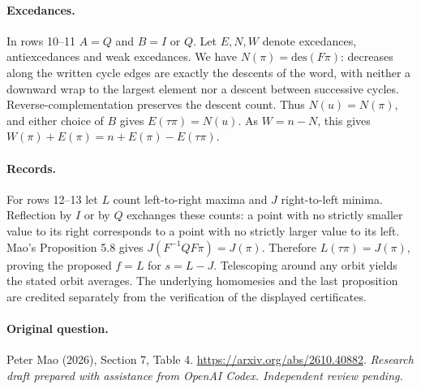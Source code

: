 \documentclass[11pt]{article}
\begin{document}
\paragraph{Excedances.} In rows 10--11 $A=Q$ and $B=I$ or $Q$. Let $E,N,W$ denote excedances, antiexcedances and weak excedances. We have $N(\pi)=\mathrm{des}(F\pi)$: decreases along the written cycle edges are exactly the descents of the word, with neither a downward wrap to the largest element nor a descent between successive cycles. Reverse-complementation preserves the descent count. Thus $N(u)=N(\pi)$, and either choice of $B$ gives $E(\tau\pi)=N(u)$. As $W=n-N$, this gives $W(\pi)+E(\pi)=n+E(\pi)-E(\tau\pi)$.
\paragraph{Records.} For rows 12--13 let $L$ count left-to-right maxima and $J$ right-to-left minima. Reflection by $I$ or by $Q$ exchanges these counts: a point with no strictly smaller value to its right corresponds to a point with no strictly larger value to its left. Mao's Proposition 5.8 gives $J(F^{-1}QF\pi)=J(\pi)$. Therefore $L(\tau\pi)=J(\pi)$, proving the proposed $f=L$ for $s=L-J$. Telescoping around any orbit yields the stated orbit averages. The underlying homomesies and the last proposition are credited separately from the verification of the displayed certificates.

\paragraph{Original question.} Peter Mao (2026), Section 7, Table 4. \url{https://arxiv.org/abs/2610.40882}.
\medskip\noindent\textit{Research draft prepared with assistance from OpenAI Codex. Independent review pending.}
\end{document}
